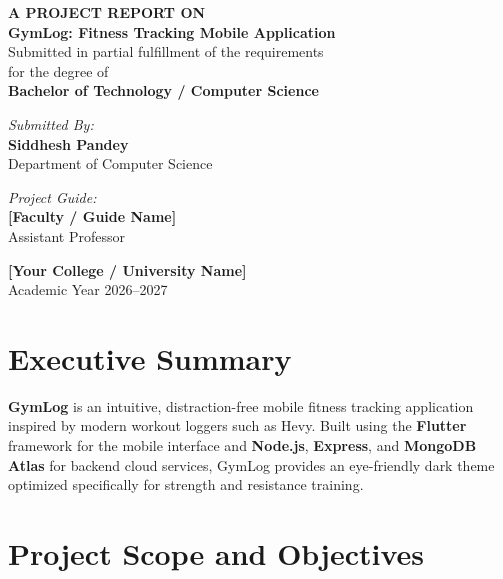 \documentclass[12pt,a4paper]{article}
\begin{document}
\begin{titlepage}
    \centering
    \vspace*{1.5cm}
    {\Large \textbf{A PROJECT REPORT ON}}\\[0.8cm]
    {\Huge \textbf{GymLog: Fitness Tracking Mobile Application}}\\[1.2cm]
    {\large Submitted in partial fulfillment of the requirements\\for the degree of}\\[0.4cm]
    {\large \textbf{Bachelor of Technology / Computer Science}}\\[2.5cm]
    \begin{minipage}{0.45\textwidth}
        \begin{flushleft} \large
            \emph{Submitted By:}\\
            \textbf{Siddhesh Pandey}\\
            Department of Computer Science
        \end{flushleft}
    \end{minipage}
    \begin{minipage}{0.45\textwidth}
        \begin{flushright} \large
            \emph{Project Guide:}\\
            \textbf{[Faculty / Guide Name]}\\
            Assistant Professor
        \end{flushright}
    \end{minipage}
    \vfill
    {\large \textbf{[Your College / University Name]}}\\[0.2cm]
    {\large Academic Year 2026--2027}
\end{titlepage}

\tableofcontents
\newpage

\section{Executive Summary}
\textbf{GymLog} is an intuitive, distraction-free mobile fitness tracking application inspired by modern workout loggers such as Hevy. Built using the \textbf{Flutter} framework for the mobile interface and \textbf{Node.js}, \textbf{Express}, and \textbf{MongoDB Atlas} for backend cloud services, GymLog provides an eye-friendly dark theme optimized specifically for strength and resistance training.

\section{Project Scope and Objectives}
\end{document}
